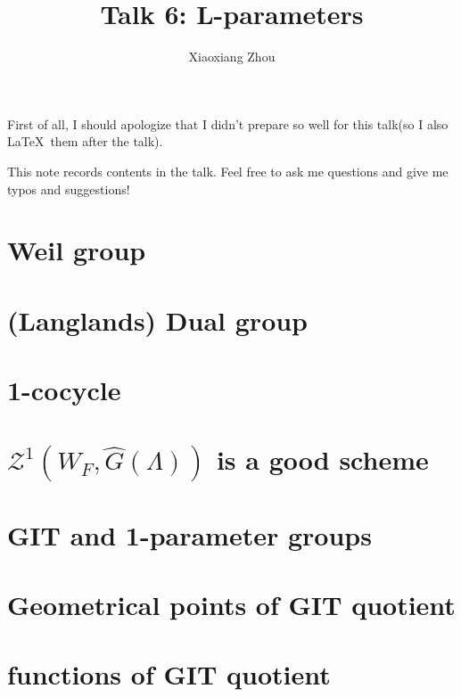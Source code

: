 \documentclass[reqno,11pt]{amsart}
\numberwithin{equation}{section}
\theoremstyle{plain}
\theoremstyle{plain}
\numberwithin{equation}{section}
\theoremstyle{remark}
\begin{document}
\date{}

\title
{Talk 6: L-parameters
}


\author{Xiaoxiang Zhou}
\address{School of Mathematical Sciences\\
University of Bonn\\
Bonn, 53115\\ Germany\\} 



\setcounter{tocdepth}{1}
\maketitle
\tableofcontents

First of all, I should apologize that I didn't prepare so well for this talk(so I also \LaTeX$\,$ them after the talk). 

This note records contents in the talk. Feel free to ask me questions and give me typos and suggestions!

\section{Weil group}
\section{(Langlands) Dual group}
\section{1-cocycle}
\section{$\mathcal{Z}^1(W_F,\hat{G}(\Lambda))$ is a good scheme}
\section{GIT and 1-parameter groups}
\section{Geometrical points of GIT quotient}
\section{functions of GIT quotient}



\end{document}
